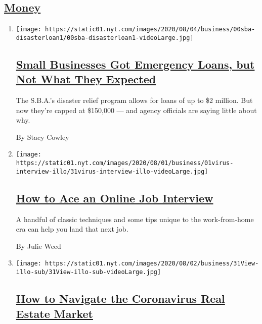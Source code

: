 \hypertarget{money}{%
\subsection{\texorpdfstring{\protect\hyperlink{}{Money}}{Money}}\label{money}}

\begin{enumerate}
\def\labelenumi{\arabic{enumi}.}
\item
  \texttt{[image: https://static01.nyt.com/images/2020/08/04/business/00sba-disasterloan1/00sba-disasterloan1-videoLarge.jpg]}

  \hypertarget{small-businesses-got-emergency-loans-but-not-what-they-expected-1}{%
  \subsection{\texorpdfstring{\href{/2020/08/03/business/small-business-loans-coronavirus.html}{Small
  Businesses Got Emergency Loans, but Not What They
  Expected}}{Small Businesses Got Emergency Loans, but Not What They Expected}}\label{small-businesses-got-emergency-loans-but-not-what-they-expected-1}}

  The S.B.A.'s disaster relief program allows for loans of up to \$2
  million. But now they're capped at \$150,000 --- and agency officials
  are saying little about why.

  By Stacy Cowley
\item
  \texttt{[image: https://static01.nyt.com/images/2020/08/01/business/01virus-interview-illo/31virus-interview-illo-videoLarge.jpg]}

  \hypertarget{how-to-ace-an-online-job-interview}{%
  \subsection{\texorpdfstring{\href{/2020/08/03/business/online-job-interview-tips.html}{How
  to Ace an Online Job
  Interview}}{How to Ace an Online Job Interview}}\label{how-to-ace-an-online-job-interview}}

  A handful of classic techniques and some tips unique to the
  work-from-home era can help you land that next job.

  By Julie Weed
\item
  \texttt{[image: https://static01.nyt.com/images/2020/08/02/business/31View-illo-sub/31View-illo-sub-videoLarge.jpg]}

  \hypertarget{how-to-navigate-the-coronavirus-real-estate-market}{%
  \subsection{\texorpdfstring{\href{/2020/07/31/business/housing-market-prices-risk.html}{How
  to Navigate the Coronavirus Real Estate
  Market}}{How to Navigate the Coronavirus Real Estate Market}}\label{how-to-navigate-the-coronavirus-real-estate-market}}


\end{enumerate}
